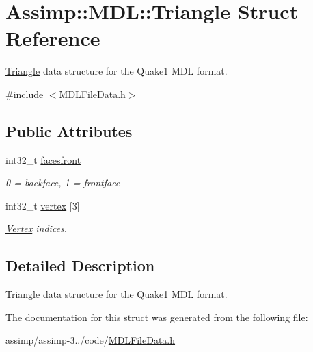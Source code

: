 \hypertarget{struct_assimp_1_1_m_d_l_1_1_triangle}{\section{Assimp\+:\+:M\+D\+L\+:\+:Triangle Struct Reference}
\label{struct_assimp_1_1_m_d_l_1_1_triangle}
}


\hyperlink{struct_assimp_1_1_m_d_l_1_1_triangle}{Triangle} data structure for the Quake1 M\+D\+L format.  




{\ttfamily \#include $<$M\+D\+L\+File\+Data.\+h$>$}

\subsection*{Public Attributes}
\begin{DoxyCompactItemize}
\item 
\hypertarget{struct_assimp_1_1_m_d_l_1_1_triangle_aff08274dde42141a4b594e2469def3a0}{int32\+\_\+t \hyperlink{struct_assimp_1_1_m_d_l_1_1_triangle_aff08274dde42141a4b594e2469def3a0}{facesfront}}\label{struct_assimp_1_1_m_d_l_1_1_triangle_aff08274dde42141a4b594e2469def3a0}

\begin{DoxyCompactList}\small\item\em 0 = backface, 1 = frontface \end{DoxyCompactList}\item 
\hypertarget{struct_assimp_1_1_m_d_l_1_1_triangle_ab3f9121485ad901253d439eb9893fe65}{int32\+\_\+t \hyperlink{struct_assimp_1_1_m_d_l_1_1_triangle_ab3f9121485ad901253d439eb9893fe65}{vertex} \mbox{[}3\mbox{]}}\label{struct_assimp_1_1_m_d_l_1_1_triangle_ab3f9121485ad901253d439eb9893fe65}

\begin{DoxyCompactList}\small\item\em \hyperlink{struct_assimp_1_1_m_d_l_1_1_vertex}{Vertex} indices. \end{DoxyCompactList}\end{DoxyCompactItemize}


\subsection{Detailed Description}
\hyperlink{struct_assimp_1_1_m_d_l_1_1_triangle}{Triangle} data structure for the Quake1 M\+D\+L format. 

The documentation for this struct was generated from the following file\+:\begin{DoxyCompactItemize}
\item 
assimp/assimp-\/3../code/\hyperlink{_m_d_l_file_data_8h}{M\+D\+L\+File\+Data.\+h}\end{DoxyCompactItemize}
